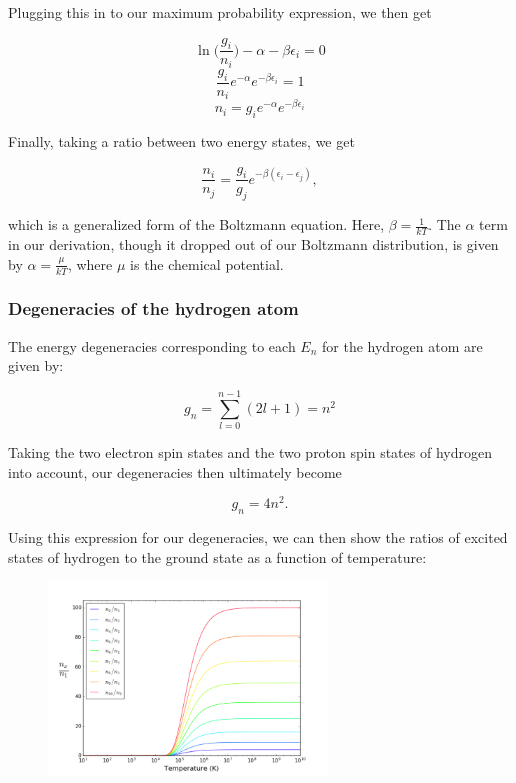\documentclass{article}
\begin{document}
Plugging this in to our maximum probability expression, we then get

$$ \ln\Big(\frac{g_i}{n_i}\Big) - \alpha - \beta\epsilon_i = 0 $$
$$ \frac{g_i}{n_i}e^{-\alpha}e^{-\beta\epsilon_i} = 1 $$
$$ n_i = g_i e^{-\alpha}e^{-\beta\epsilon_i} $$

Finally, taking a ratio between two energy states, we get

$$ \frac{n_i}{n_j} = \frac{g_i}{g_j}e^{-\beta(\epsilon_i - \epsilon_j)}, $$

which is a generalized form of the Boltzmann equation. Here, $\beta = \frac{1}{kT}$. The $\alpha$ term in our derivation, though it dropped out of our Boltzmann distribution, is given by $\alpha = \frac{\mu}{kT}$, where $\mu$ is the chemical potential.

\subsubsection{Degeneracies of the hydrogen atom}

The energy degeneracies corresponding to each $E_n$ for the hydrogen atom are given by:

\begin{equation}
g_n = \sum^{n-1}_{l=0} (2l + 1) = n^2
\end{equation}

Taking the two electron spin states and the two proton spin states of hydrogen into account, our degeneracies then ultimately become

\begin{equation}
g_n = 4n^2.
\end{equation}

Using this expression for our degeneracies, we can then show the ratios of excited states of hydrogen to the ground state as a function of temperature:

\begin{figure}[ht]
    \centering
    \includegraphics[width=0.66\textwidth]{boltzmann.png}
    \caption{}
    \label{fig:Boltzmann}
\end{figure}
\end{document}
